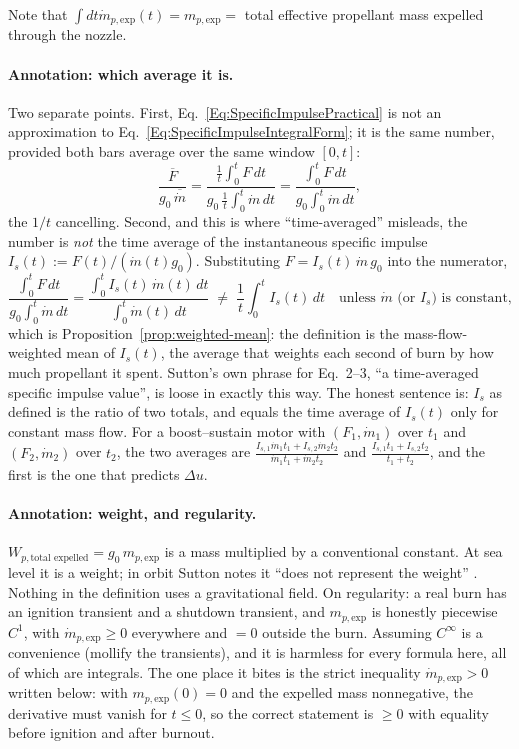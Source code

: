 Note that $\int dt \dot{m}_{p, \text{exp}}(t) = m_{p, \text{exp}} = $ total
effective propellant mass expelled through the nozzle.

\paragraph*{Annotation: which average it is.}
Two separate points. First,
Eq.~\ref{Eq:SpecificImpulsePractical} is not an approximation to
Eq.~\ref{Eq:SpecificImpulseIntegralForm}; it is the same number, provided both
bars average over the same window $[0,t]$:
\[
 \frac{\overline F}{g_0\,\overline{\dot m}}
 =\frac{\frac1t\int_0^tF\,dt}{g_0\,\frac1t\int_0^t\dot m\,dt}
 =\frac{\int_0^tF\,dt}{g_0\int_0^t\dot m\,dt},
\]
the $1/t$ cancelling. Second, and this is where ``time-averaged'' misleads,
the number is \emph{not} the time average of the instantaneous specific
impulse $I_s(t):=F(t)/(\dot m(t)g_0)$. Substituting $F=I_s(t)\,\dot m\,g_0$
into the numerator,
\[
 \frac{\int_0^tF\,dt}{g_0\int_0^t\dot m\,dt}
 =\frac{\int_0^tI_s(t)\,\dot m(t)\,dt}{\int_0^t\dot m(t)\,dt}
 \;\ne\;\frac1t\int_0^tI_s(t)\,dt
 \quad\text{unless $\dot m$ (or $I_s$) is constant,}
\]
which is Proposition~\ref{prop:weighted-mean}: the definition is the
mass-flow-weighted mean of $I_s(t)$, the average that weights each second of
burn by how much propellant it spent. Sutton's own phrase for Eq.~2--3,
``a time-averaged specific impulse value'', is loose in exactly this way. The
honest sentence is: $I_s$ as defined is the ratio of two totals, and equals
the time average of $I_s(t)$ only for constant mass flow. For a
boost--sustain motor with $(F_1,\dot m_1)$ over $t_1$ and $(F_2,\dot m_2)$
over $t_2$, the two averages are
$\frac{I_{s,1}\dot m_1t_1+I_{s,2}\dot m_2t_2}{\dot m_1t_1+\dot m_2t_2}$ and
$\frac{I_{s,1}t_1+I_{s,2}t_2}{t_1+t_2}$, and the first is the one that
predicts $\Delta u$.

\paragraph*{Annotation: weight, and regularity.}
$W_{p,\text{total expelled}}=g_0\,m_{p,\text{exp}}$ is a mass multiplied by a
conventional constant. At sea level it is a weight; in orbit Sutton notes it
``does not represent the weight'' \cite[Section 2.1]{sutton}. Nothing in the
definition uses a gravitational field. On regularity: a real burn has an
ignition transient and a shutdown transient, and $m_{p,\text{exp}}$ is
honestly piecewise $C^1$, with $\dot m_{p,\text{exp}}\ge0$ everywhere and
$=0$ outside the burn. Assuming $C^\infty$ is a convenience (mollify the
transients), and it is harmless for every formula here, all of which are
integrals. The one place it bites is the strict inequality
$\dot m_{p,\text{exp}}>0$ written below: with $m_{p,\text{exp}}(0)=0$ and the
expelled mass nonnegative, the derivative must vanish for $t\le0$, so the
correct statement is $\ge0$ with equality before ignition and after burnout.

